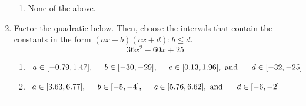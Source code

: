\documentclass[14pt]{extbook}
\newcommand{\litem}[1]{\item#1\hspace*{-1cm}\rule{\textwidth}{0.4pt}}
\begin{document}
\begin{enumerate}
{\begin{enumerate}[label=\Alph*.]
\item None of the above.
\end{enumerate} }
\litem{
Factor the quadratic below. Then, choose the intervals that contain the constants in the form $(ax+b)(cx+d); b \leq d.$\[ 36x^{2} -60 x + 25 \]\begin{enumerate}[label=\Alph*.]
\item \( a \in [-0.79, 1.47], \hspace*{5mm} b \in [-30, -29], \hspace*{5mm} c \in [0.13, 1.96], \text{ and } \hspace*{5mm} d \in [-32, -25] \)
\item \( a \in [3.63, 6.77], \hspace*{5mm} b \in [-5, -4], \hspace*{5mm} c \in [5.76, 6.62], \text{ and } \hspace*{5mm} d \in [-6, -2] \)

\end{enumerate}}
\end{enumerate}
\end{document}
